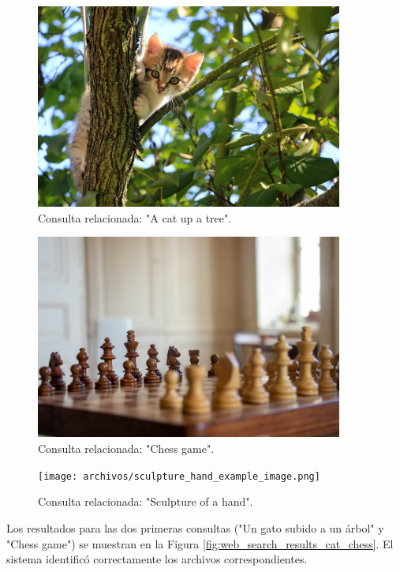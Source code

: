 \begin{figure}[H]
\centering
\includegraphics[width=0.9\textwidth]{archivos/cat_example_image.png}
\caption[Imagen de un gato subido a un árbol]{Consulta relacionada: "A cat up a tree".}
\label{fig:search_cat_tree}
\end{figure}

\begin{figure}[H]
\centering
\includegraphics[width=0.9\textwidth]{archivos/chess_example_image.png}
\caption[Imagen de un tablero de ajedrez]{Consulta relacionada: "Chess game".}
\label{fig:search_chess}
\end{figure}

\begin{figure}[H]
\centering
\texttt{[image: archivos/sculpture\_hand\_example\_image.png]}
\caption[Imagen de una escultura de una mano]{Consulta relacionada: "Sculpture of a hand".}
\label{fig:search_hand_sculpture}
\end{figure}

Los resultados para las dos primeras consultas ("Un gato subido a un árbol" y "Chess game") se muestran en la Figura \ref{fig:web_search_results_cat_chess}. El sistema identificó correctamente los archivos correspondientes.


